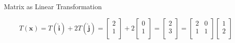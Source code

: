 \documentclass{beamer}
\begin{document}
\begin{frame}{Matrix as Linear Transformation}
\begin{itemize}
\vspace{-12.1pt}
\begin{equation*}
T(\mathbf{x})=T(\boldsymbol{\hat{i}})+2T(\boldsymbol{\hat{j}})=
\left[ \begin{array}{c}
	2\\
	1\\
\end{array} \right] +2\left[ \begin{array}{c}
	0\\
	1\\
\end{array} \right] =\left[ \begin{array}{c}
	2\\
	3\\
\end{array} \right] =\left[ \begin{matrix}
	2&		0\\
	1&		1\\
\end{matrix} \right] \left[ \begin{array}{c}
	1\\
	2\\
\end{array} \right]
\end{equation*}

\end{itemize}
\end{frame}
\end{document}
